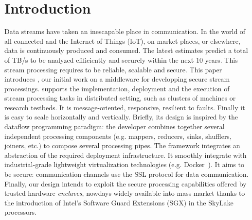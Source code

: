 \section{Introduction}
\label{sec:introduction}


Data streams have taken an inescapable place in communication.
In the world of all-connected and the Internet-of-Things (IoT), on market places, or elsewhere, data is continuously produced and consumed. 
The latest estimates predict a total of  TB/s to be analyzed efificiently and securely within the next 10 years.
This stream processing requires to be reliable, scalable and secure.
This paper introduces \SYS, our initial work on a middleware for developping secure stream processings. 
\SYS supports the implementation, deployment and the execution of stream processing tasks in distributed setting, such as clusters of machines or research testbeds.
It is message-oriented, responsive, resilient to faults.
Finally it is easy to scale horizontally and vertically\cite{reactivemanifesto}.
Briefly, its design is inspired by the dataflow programming paradigm: the developer combines together several independent processing components (e.g. mappers, reducers, sinks, shufflers, joiners, etc.) to compose several processing pipes.%
The framework integrates an abstraction of the required deployment infrastructure.
It smoothly integrate with industrial-grade lightweight virtualization technologies (e.g. Docker~\cite{}).%
It aims to be secure: communication channels use the SSL protocol for data communication.
Finally, our design intends to exploit the secure processing capabilities offered by trusted hardware \emph{enclaves}, nowdays widely available into mass-market thanks to the introduction of Intel's Software Guard Extensions (SGX)\cite{costan_intel} in the SkyLake processors.

